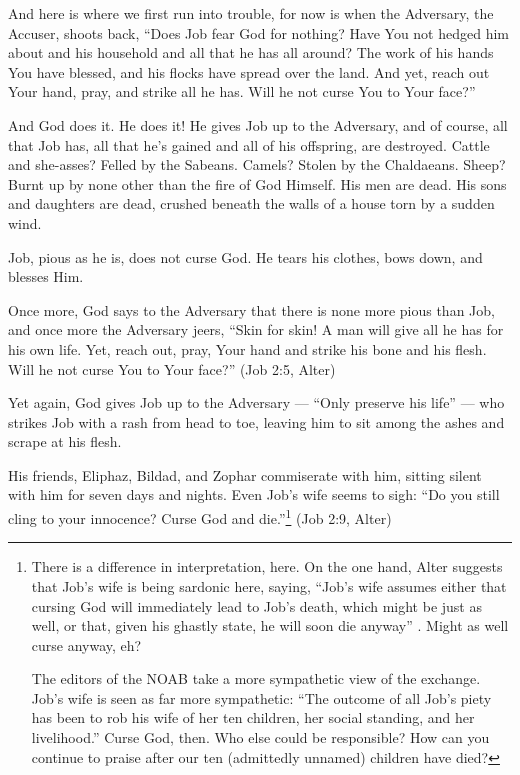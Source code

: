 And here is where we first run into trouble, for now is when the Adversary, the Accuser, shoots back, ``Does Job fear God for nothing? Have You not hedged him about and his household and all that he has all around? The work of his hands You have blessed, and his flocks have spread over the land. And yet, reach out Your hand, pray, and strike all he has. Will he not curse You to Your face?''

And God does it. He does it! He gives Job up to the Adversary, and of course, all that Job has, all that he's gained and all of his offspring, are destroyed. Cattle and she-asses? Felled by the Sabeans. Camels? Stolen by the Chaldaeans. Sheep? Burnt up by none other than the fire of God Himself. His men are dead. His sons and daughters are dead, crushed beneath the walls of a house torn by a sudden wind.

Job, pious as he is, does not curse God. He tears his clothes, bows down, and blesses Him.

Once more, God says to the Adversary that there is none more pious than Job, and once more the Adversary jeers, ``Skin for skin! A man will give all he has for his own life. Yet, reach out, pray, Your hand and strike his bone and his flesh. Will he not curse You to Your face?'' (Job 2:5, Alter)

Yet again, God gives Job up to the Adversary --- ``Only preserve his life'' --- who strikes Job with a rash from head to toe, leaving him to sit among the ashes and scrape at his flesh.

His friends, Eliphaz, Bildad, and Zophar commiserate with him, sitting silent with him for seven days and nights. Even Job's wife seems to sigh: ``Do you still cling to your innocence? Curse God and die.''\footnote{There is a difference in interpretation, here. On the one hand, Alter suggests that Job's wife is being sardonic here, saying, ``Job's wife assumes either that cursing God will immediately lead to Job's death, which might be just as well, or that, given his ghastly state, he will soon die anyway'' \parencite[469]{alter}. Might as well curse anyway, eh?

  The editors of the NOAB take a more sympathetic view of the exchange. Job's wife is seen as far more sympathetic: ``The outcome of all Job's piety has been to rob his wife of her ten children, her social standing, and her livelihood.'' \parencite[737]{noab} Curse God, then. Who else could be responsible? How can you continue to praise after our ten (admittedly unnamed) children have died?} (Job 2:9, Alter)

